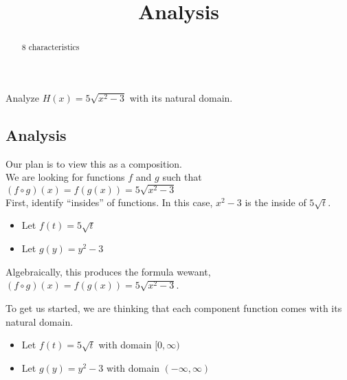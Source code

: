 \documentclass{ximera}
\title{Analysis}
\begin{document}
\begin{abstract}
8 characteristics
\end{abstract}
\maketitle












Analyze $H(x) = 5 \sqrt{x^2-3}$ with its natural domain. \\



\subsection*{Analysis}




Our plan is to view this as a composition. \\






We are looking for functions $f$ and $g$ such that $(f \circ g)(x) = f(g(x)) = 5 \sqrt{x^2-3}$ \\


First, identify ``insides'' of functions.  In this case, $x^2 - 3$ is the inside of $5 \sqrt{t}$. \\



\begin{itemize}
\item Let $f(t) = 5 \sqrt{t}$ \\
\item Let $g(y) = y^2 - 3$ \\
\end{itemize}

Algebraically, this produces the formula wewant, $(f \circ g)(x) = f(g(x)) = 5 \sqrt{x^2-3}$.

To get us started, we are thinking that each component function comes with its natural domain.

\begin{itemize}
\item Let $f(t) = 5 \sqrt{t}$ with domain $[0, \infty)$ \\
\item Let $g(y) = y^2 - 3$ with domain $(-\infty, \infty)$ \\
\end{itemize}
\end{document}
